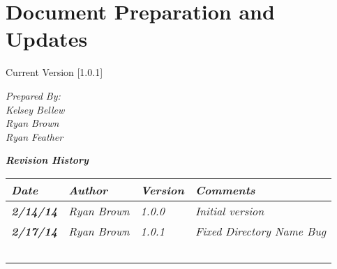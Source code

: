 
\chapter{Document Preparation and Updates}

Current Version [1.0.1]
\vspace*{5mm}

{\color{MSBlue3}
\noindent
\textit{Prepared By:}\\
\textit{Kelsey Bellew}\\
\textit{Ryan Brown}\\
\textit{Ryan Feather}
}

\vfill
\noindent
{\color{color02} \textit{\textbf{Revision History}}}\\
\begin{tabular}{|>{\raggedright}p{1.5cm}|>{\raggedright}p{3cm}|>{\raggedright}p{1.5cm}|>{\raggedright}p{9cm}|}
\hline
\textit{\textbf{Date}} &  \textit{\textbf{Author}} & \textit{\textbf{Version}} & \textit{\textbf{Comments}}\tabularnewline
\hline
 \textit{\textbf{2/14/14}} & \textit{Ryan Brown} & \textit{1.0.0} & \textit{Initial version}\tabularnewline
\hline
 \textit{\textbf{2/17/14}} & \textit{Ryan Brown} & \textit{1.0.1} & \textit{Fixed Directory Name Bug}\tabularnewline
\hline
 &  &  & \tabularnewline
 \hline
 &  &  & \tabularnewline
\hline
 &  &  & \tabularnewline
\hline
 &  &  & \tabularnewline
\hline
 &  &  & \tabularnewline
\hline
\end{tabular}
\vfill

